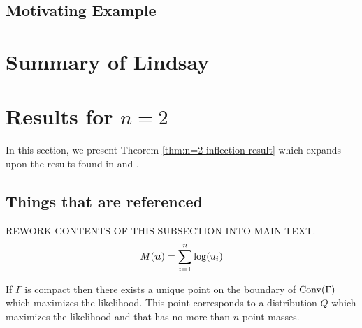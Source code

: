 	\subsection{Motivating Example}

\section{Summary of Lindsay}

\section{Results for \texorpdfstring{$n = 2$}{n = 2}}
	In this section, we present Theorem \ref{thm:n=2 inflection result} which 
	expands upon the results found in \cite{Lindsay1983-tf} and \cite{Lindsay1983a-he}.

	\subsection{Things that are referenced}
	REWORK CONTENTS OF THIS SUBSECTION INTO MAIN TEXT.
	\begin{equation}
		M({\bm{{u}}}) = \sum_{i=1}^n \log(u_i)
		\label{eq:transformedlikelihood}
	\end{equation}

	\begin{theorem}
		If $\Gamma$ is compact then there exists a unique point on the boundary of $\mathrm{Conv}(\Gamma)$ which maximizes the likelihood. This point corresponds to a distribution $Q$ which maximizes the likelihood and that has no more than $n$ point masses.
		\label{thm:LindsayGamma}
	\end{theorem}

